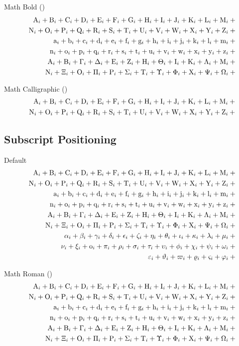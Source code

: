 \documentclass[12pt, a4paper, oneside]{article}
\theoremstyle{Plain}
\theoremstyle{Definition}
\theoremstyle{Remark}
\begin{document}
\begin{appendix}
Math Bold (\texttt{\string\mathbf})
\def\test#1{\mathbf{#1}^{2}+{}}%
\begin{eqnarray*}
  && {\testupperi}\\
  && {\testupperii}\\
  && {\testloweri}\\
  && {\testlowerii}\\
  && {\testupgreeki}\\
  && {\testupgreekii}
\end{eqnarray*}

Math Calligraphic (\texttt{\string\mathcal})
\def\test#1{\mathcal{#1}^{2}+{}}%
\begin{eqnarray*}
  && {\testupperi}\\
  && {\testupperii}
\end{eqnarray*}%


\subsection{Subscript Positioning \showfamily}

Default
\def\test#1{\mathnormal{#1}_{i}+{}}%
\begin{eqnarray*}
  && {\testupperi}\\
  && {\testupperii}\\
  && {\testloweri}\\
  && {\testlowerii}\\
  && {\testupgreeki}\\
  && {\testupgreekii}\\
  && {\testlowgreeki}\\
  && {\testlowgreekii}\\
  && {\testlowgreekiii}
\end{eqnarray*}%

Math Roman (\texttt{\string\mathrm})
\def\test#1{\mathrm{#1}_{i}+{}}%
\begin{eqnarray*}
  && {\testupperi}\\
  && {\testupperii}\\
  && {\testloweri}\\
  && {\testlowerii}\\
  && {\testupgreeki}\\
  && {\testupgreekii}
\end{eqnarray*}%



\end{appendix}
\end{document}
